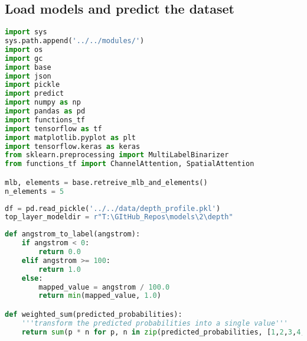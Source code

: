 \hypertarget{load-models-and-predict-the-dataset}{%
\subsection*{Load models and predict the
dataset}\label{load-models-and-predict-the-dataset}}

\begin{lstlisting}[language=Python]
import sys
sys.path.append('../../modules/')
import os
import gc
import base
import json
import pickle
import predict
import numpy as np
import pandas as pd
import functions_tf
import tensorflow as tf
import matplotlib.pyplot as plt
import tensorflow.keras as keras
from sklearn.preprocessing import MultiLabelBinarizer
from functions_tf import ChannelAttention, SpatialAttention

mlb, elements = base.retreive_mlb_and_elements()
n_elements = 5
\end{lstlisting}

\begin{lstlisting}[language=Python]
df = pd.read_pickle('../../data/depth_profile.pkl')
top_layer_modeldir = r"T:\GItHub_Repos\models\2\depth"
\end{lstlisting}

\begin{lstlisting}[language=Python]
def angstrom_to_label(angstrom):
    if angstrom < 0:
        return 0.0
    elif angstrom >= 100:
        return 1.0
    else:
        mapped_value = angstrom / 100.0
        return min(mapped_value, 1.0)

def weighted_sum(predicted_probabilities):
    '''transform the predicted probabilities into a single value'''
    return sum(p * n for p, n in zip(predicted_probabilities, [1,2,3,4,5]))
\end{lstlisting}

